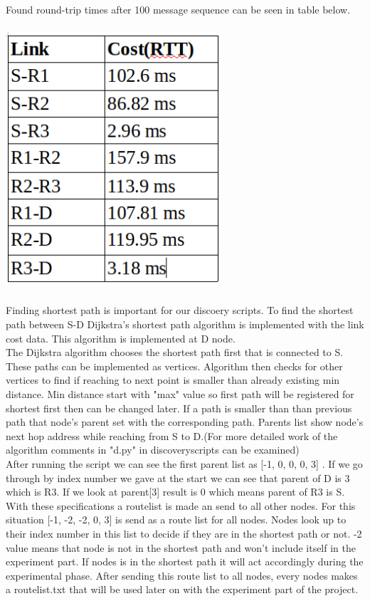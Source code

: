 \documentclass[conference]{IEEEtran}
\begin{document}
Found round-trip times after 100 message sequence can be seen in table below.\\ \qquad \\

\includegraphics[width = 80mm, height = 95mm]{rtt.png}\\ \qquad \\

Finding shortest path is important for our discoery scripts. To find the shortest path between S-D Dijkstra’s shortest path algorithm is implemented with the link cost data. This algorithm is implemented at D node.\\

The Dijkstra algorithm chooses the shortest path first that is connected to S. These paths can be implemented as vertices. Algorithm then checks for other vertices to find if reaching to next point is smaller than already existing min distance. Min distance start with "max" value so first path will be registered for shortest first then can be changed later. If a path is smaller than than previous path that node's parent set with the corresponding path. Parents list show node's next hop address while reaching from S to D.(For more detailed work of the algorithm comments in "d.py" in discoveryscripts can be examined)\\

After running the script we can see the first parent list as [-1, 0, 0, 0, 3] . If we go through by index number we gave at the start we can see that parent of D is 3 which is R3. If we look at parent[3] result is 0 which means parent of R3 is S. With these specifications a routelist is made an send to all other nodes. For this situation [-1, -2, -2, 0, 3] is send as a route list for all nodes. Nodes look up to their index number in this list to decide if they are in the shortest path or not. -2 value means that  node is not in the shortest path and won't include itself in the experiment part. If nodes is in the shortest path it will act accordingly during the experimental phase. After sending this route list to all nodes, every nodes makes a routelist.txt that will be used later on with the experiment part of the project.\\
\end{document}
